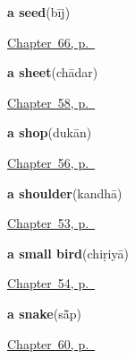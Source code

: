 \noindent\begin{minipage}[t]{\linewidth}
\raggedright
\textbf{a seed}\enspace\emph{}\enspace(bīj)\par
\footnotesize \hyperref[ch:hi-the-field-and-the-well]{Chapter~66, p.~\pageref*{ch:hi-the-field-and-the-well}}
\end{minipage}\par\smallskip

\noindent\begin{minipage}[t]{\linewidth}
\raggedright
\textbf{a sheet}\enspace\emph{}\enspace(chādar)\par
\footnotesize \hyperref[ch:hi-inside-the-house]{Chapter~58, p.~\pageref*{ch:hi-inside-the-house}}
\end{minipage}\par\smallskip

\noindent\begin{minipage}[t]{\linewidth}
\raggedright
\textbf{a shop}\enspace\emph{}\enspace(dukān)\par
\footnotesize \hyperref[ch:hi-the-road]{Chapter~56, p.~\pageref*{ch:hi-the-road}}
\end{minipage}\par\smallskip

\noindent\begin{minipage}[t]{\linewidth}
\raggedright
\textbf{a shoulder}\enspace\emph{}\enspace(kandhā)\par
\footnotesize \hyperref[ch:hi-more-of-the-body]{Chapter~53, p.~\pageref*{ch:hi-more-of-the-body}}
\end{minipage}\par\smallskip

\noindent\begin{minipage}[t]{\linewidth}
\raggedright
\textbf{a small bird}\enspace\emph{}\enspace(chiṛiyā)\par
\footnotesize \hyperref[ch:hi-animals]{Chapter~54, p.~\pageref*{ch:hi-animals}}
\end{minipage}\par\smallskip

\noindent\begin{minipage}[t]{\linewidth}
\raggedright
\textbf{a snake}\enspace\emph{}\enspace(sā̃p)\par
\footnotesize \hyperref[ch:hi-animals-in-the-yard]{Chapter~60, p.~\pageref*{ch:hi-animals-in-the-yard}}
\end{minipage}\par\smallskip

